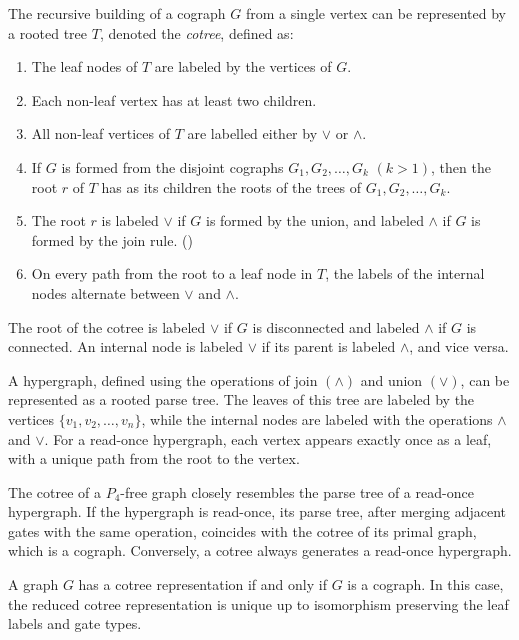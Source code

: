 The recursive building of a cograph $G$ from a single vertex can be represented by a rooted tree $T$, denoted the \emph{cotree}, defined as:
\begin{enumerate}
\item The leaf nodes of $T$ are labeled by the vertices of $G$.
\item Each non-leaf vertex has at least two children.
\item All non-leaf vertices of $T$ are labelled either by $\vee$ or $\wedge$.
\item If $G$ is formed from the disjoint cographs $G_1,G_2,\dots,G_k$ $(k>1)$, then the root $r$ of $T$ has as its children the roots of the trees of $G_1,G_2,\dots,G_k$.
\item The root $r$ is labeled $\vee$ if $G$ is formed by the union, and labeled $\wedge$ if $G$ is formed by the join rule. (\theequation)
\item On every path from the root to a leaf node in $T$, the labels of the internal nodes alternate between $\vee$ and $\wedge$.
\end{enumerate}

The root of the cotree is labeled $\vee$ if $G$ is disconnected and labeled $\wedge$ if $G$ is connected. An internal node is labeled $\vee$ if its parent is labeled $\wedge$, and vice versa.

A hypergraph, defined using the operations of join $(\wedge)$ and union $(\vee)$, can be represented as a rooted parse tree. The leaves of this tree are labeled by the vertices $\{v_1,v_2,\dots,v_n\}$, while the internal nodes are labeled with the operations $\wedge$ and $\vee$. For a read-once hypergraph, each vertex appears exactly once as a leaf, with a unique path from the root to the vertex.

The cotree of a $P_4$-free graph closely resembles the parse tree of a read-once hypergraph. If the hypergraph is read-once, its parse tree, after merging adjacent gates with the same operation, coincides with the cotree of its primal graph, which is a cograph. Conversely, a cotree always generates a read-once hypergraph.

\begin{theorem}
A graph $G$ has a cotree representation if and only if $G$ is a cograph. In this case, the reduced cotree representation is unique up to isomorphism preserving the leaf labels and gate types.
\end{theorem}

\cite{CLB81}

